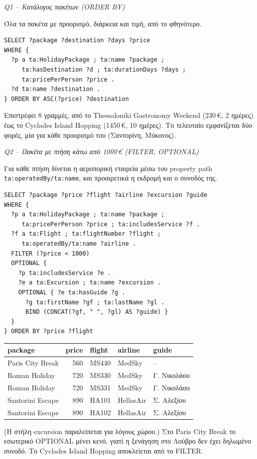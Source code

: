 \documentclass[conference]{IEEEtran}
\newcommand{\query}[1]{\par\medskip\noindent\textit{#1}\par\nobreak\smallskip}
\begin{document}
\query{Q1 -- Κατάλογος πακέτων (ORDER BY)}
Όλα τα πακέτα με προορισμό, διάρκεια και τιμή, από το φθηνότερο.
\begin{lstlisting}
SELECT ?package ?destination ?days ?price
WHERE {
  ?p a ta:HolidayPackage ; ta:name ?package ;
     ta:hasDestination ?d ; ta:durationDays ?days ;
     ta:pricePerPerson ?price .
  ?d ta:name ?destination .
} ORDER BY ASC(?price) ?destination
\end{lstlisting}
Επιστρέφει 8 γραμμές, από το Thessaloniki Gastronomy Weekend (230\,€, 2 ημέρες)
έως το Cyclades Island Hopping (1450\,€, 10 ημέρες). Το τελευταίο εμφανίζεται δύο
φορές, μία για κάθε προορισμό του (Σαντορίνη, Μύκονος).

\query{Q2 -- Πακέτα με πτήση κάτω από 1000\,€ (FILTER, OPTIONAL)}
Για κάθε πτήση δίνεται η αεροπορική εταιρεία μέσω του property path
\texttt{ta:operatedBy/ta:name}, και προαιρετικά η εκδρομή και ο συνοδός της.
\begin{lstlisting}
SELECT ?package ?price ?flight ?airline ?excursion ?guide
WHERE {
  ?p a ta:HolidayPackage ; ta:name ?package ;
     ta:pricePerPerson ?price ; ta:includesService ?f .
  ?f a ta:Flight ; ta:flightNumber ?flight ;
     ta:operatedBy/ta:name ?airline .
  FILTER (?price < 1000)
  OPTIONAL {
    ?p ta:includesService ?e .
    ?e a ta:Excursion ; ta:name ?excursion .
    OPTIONAL { ?e ta:hasGuide ?g .
      ?g ta:firstName ?gf ; ta:lastName ?gl .
      BIND (CONCAT(?gf, " ", ?gl) AS ?guide) }
  }
} ORDER BY ?price ?flight
\end{lstlisting}
\begin{center}\scriptsize\setlength{\tabcolsep}{3pt}
\begin{tabular}{@{}lrlll@{}}
\toprule
package & price & flight & airline & guide \\
\midrule
Paris City Break & 560 & MS440 & MedSky & -- \\
Roman Holiday & 720 & MS330 & MedSky & Γ. Νικολάου \\
Roman Holiday & 720 & MS331 & MedSky & Γ. Νικολάου \\
Santorini Escape & 890 & HA101 & HellasAir & Σ. Αλεξίου \\
Santorini Escape & 890 & HA102 & HellasAir & Σ. Αλεξίου \\
\bottomrule
\end{tabular}\end{center}
(Η στήλη excursion παραλείπεται για λόγους χώρου.) Στο Paris City Break το
εσωτερικό OPTIONAL μένει κενό, γιατί η ξενάγηση στο Λούβρο δεν έχει δηλωμένο
συνοδό. Το Cyclades Island Hopping αποκλείεται από το FILTER.
\end{document}
